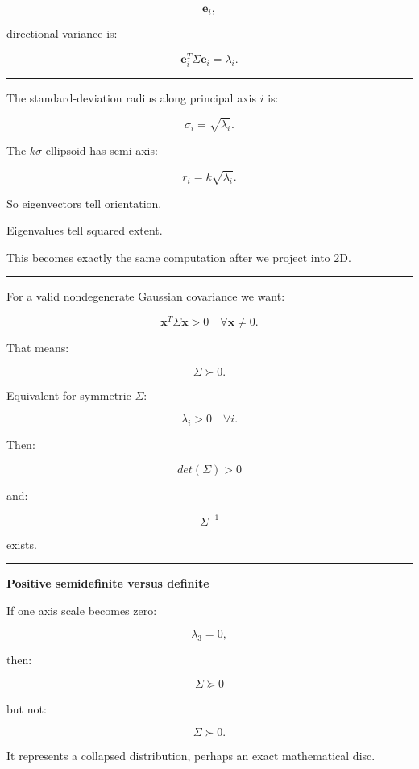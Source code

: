 \[
\mathbf e_i,
\]

directional variance is:

\[
\mathbf e_i^T
\Sigma
\mathbf e_i
=
\lambda_i.
\]

\begin{center}\rule{0.5\linewidth}{0.5pt}\end{center}

The standard-deviation radius along principal axis \(i\) is:

\[
\boxed{
\sigma_i=
\sqrt{\lambda_i}.
}
\]

The \(k\sigma\) ellipsoid has semi-axis:

\[
\boxed{
r_i=
k\sqrt{\lambda_i}.
}
\]

So eigenvectors tell orientation.

Eigenvalues tell squared extent.

This becomes exactly the same computation after we project into 2D.

\begin{center}\rule{0.5\linewidth}{0.5pt}\end{center}

For a valid nondegenerate Gaussian covariance we want:

\[
\boxed{
\mathbf x^T
\Sigma
\mathbf x
>
0
\quad
\forall\mathbf x\ne0.
}
\]

That means:

\[
\Sigma\succ0.
\]

Equivalent for symmetric \(\Sigma\):

\[
\lambda_i>0
\quad
\forall i.
\]

Then:

\[
det(\Sigma)>0
\]

and:

\[
\Sigma^{-1}
\]

exists.

\begin{center}\rule{0.5\linewidth}{0.5pt}\end{center}

\textbf{Positive semidefinite versus definite}

If one axis scale becomes zero:

\[
\lambda_3=0,
\]

then:

\[
\Sigma\succeq0
\]

but not:

\[
\Sigma\succ0.
\]

It represents a collapsed distribution, perhaps an exact mathematical disc.

